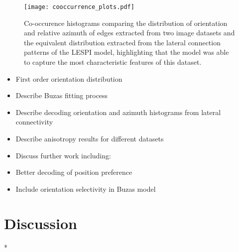 \begin{figure}
	\centering
        \texttt{[image: cooccurrence\_plots.pdf]}
	\caption{Co-occurence histograms comparing the distribution of
          orientation and relative azimuth of edges extracted from two
          image datasets and the equivalent distribution extracted
          from the lateral connection patterns of the LESPI model,
          highlighting that the model was able to capture the most
          characteristic features of this dataset.}
	\label{cooccurrence}
\end{figure}


\begin{itemize}
\item First order orientation distribution
\item Describe Buzas fitting process
\item Describe decoding orientation and azimuth histograms from lateral
  connectivity
\item Describe anisotropy results for different datasets
\item Discuss further work including:
\item Better decoding of position preference
\item Include orientation selectivity in Buzas model
\end{itemize}



\section{Discussion}

* 
